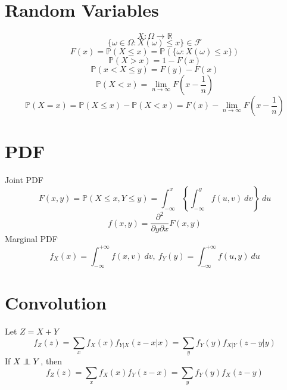 \documentclass[twocolumn]{amsart}
\renewcommand{\P}{\mathbb{P}}
\newcommand\independent{\protect\mathpalette{\protect\independenT}{\perp}}
\def\independenT#1#2{\mathrel{\rlap{$#1#2$}\mkern3mu{#1#2}}}
\begin{document}
\section*{Random Variables}
\begin{equation*}
  X: \Omega \rightarrow \mathbb{R}
\end{equation*}
\begin{equation*}
  \{\omega \in \Omega : X(\omega) \leq x\} \in \mathcal{F}
\end{equation*}
\begin{equation*}
  F(x) = \P(X \leq x) = \P(\{\omega : X(\omega) \leq x\})
\end{equation*}
\begin{equation*}
  \P(X>x) = 1-F(x)
\end{equation*}
\begin{equation*}
  \P(x<X\leq y) = F(y) - F(x)
\end{equation*}
\begin{equation*}
  \P(X<x) = \lim_{n\to \infty}F(x - \frac{1}{n})
\end{equation*}
\begin{equation*}
  \P(X=x) = \P(X\leq x) - \P(X < x) = F(x)-\lim_{n\to \infty}F(x-\frac{1}{n})
\end{equation*}

\section*{PDF}
Joint PDF
\begin{equation*}
  F(x,y) = \P(X \leq x,Y \leq y) = \int_{-\infty}^{x}\left\{ \int_{-\infty}^{y}
    f(u,v)~dv\right\}~du
\end{equation*}
\begin{equation*}
  f(x,y) = \frac{\partial^{2}}{\partial y \partial x}F(x,y)
\end{equation*}
Marginal PDF
\begin{equation*}
  f_{X}(x) = \int_{-\infty}^{+\infty} f(x,v)~dv,~f_{Y}(y) = \int_{-\infty}^{+\infty} f(u,y)~du
\end{equation*}

\section*{Convolution}
Let $Z=X+Y$
\begin{equation*}
  f_{Z}(z)=\sum_{x}f_{X}(x)f_{Y|X}(z-x|x) = \sum_{y}f_{Y}(y)f_{X|Y}(z-y|y)
\end{equation*}
If \(X \independent Y\), then
\begin{equation*}
  f_{Z}(z)=\sum_{x}f_{X}(x)f_{Y}(z-x) = \sum_{y}f_{Y}(y)f_{X}(z-y)
\end{equation*}
\end{document}
